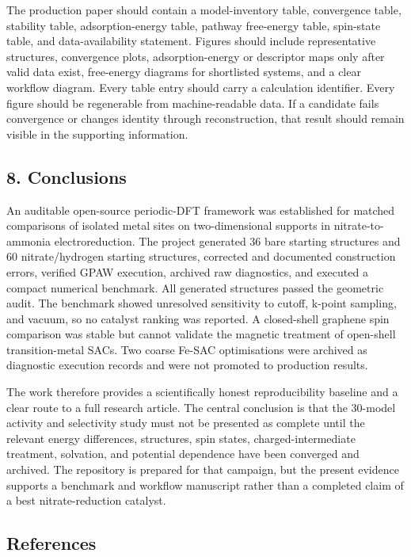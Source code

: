 \documentclass[
]{article}
\begin{document}
The production paper should contain a model-inventory table, convergence
table, stability table, adsorption-energy table, pathway free-energy
table, spin-state table, and data-availability statement. Figures should
include representative structures, convergence plots, adsorption-energy
or descriptor maps only after valid data exist, free-energy diagrams for
shortlisted systems, and a clear workflow diagram. Every table entry
should carry a calculation identifier. Every figure should be
regenerable from machine-readable data. If a candidate fails convergence
or changes identity through reconstruction, that result should remain
visible in the supporting information.

\hypertarget{conclusions}{%
\subsection{8. Conclusions}\label{conclusions}}

An auditable open-source periodic-DFT framework was established for
matched comparisons of isolated metal sites on two-dimensional supports
in nitrate-to-ammonia electroreduction. The project generated 36 bare
starting structures and 60 nitrate/hydrogen starting structures,
corrected and documented construction errors, verified GPAW execution,
archived raw diagnostics, and executed a compact numerical benchmark.
All generated structures passed the geometric audit. The benchmark
showed unresolved sensitivity to cutoff, k-point sampling, and vacuum,
so no catalyst ranking was reported. A closed-shell graphene spin
comparison was stable but cannot validate the magnetic treatment of
open-shell transition-metal SACs. Two coarse Fe-SAC optimisations were
archived as diagnostic execution records and were not promoted to
production results.

The work therefore provides a scientifically honest reproducibility
baseline and a clear route to a full research article. The central
conclusion is that the 30-model activity and selectivity study must not
be presented as complete until the relevant energy differences,
structures, spin states, charged-intermediate treatment, solvation, and
potential dependence have been converged and archived. The repository is
prepared for that campaign, but the present evidence supports a
benchmark and workflow manuscript rather than a completed claim of a
best nitrate-reduction catalyst.

\hypertarget{references}{%
\subsection{References}\label{references}}
\end{document}
